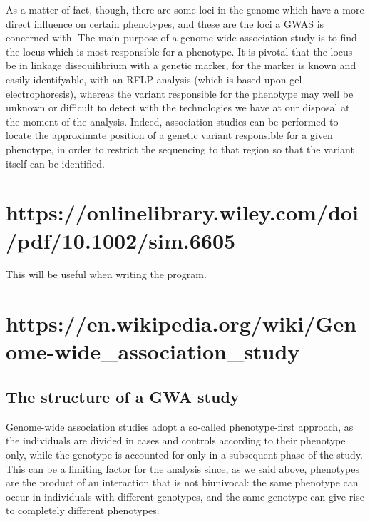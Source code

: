 \documentclass[../main.tex]{subfiles}
\begin{document}
As a matter of fact, though, there are some loci in the genome which 
have a more direct influence on certain phenotypes, and these are the 
loci a GWAS is concerned with. The main purpose of a genome-wide 
association study is to find the locus which is most responsible for a 
phenotype. It is pivotal that the locus be in linkage disequilibrium 
with a genetic marker, for the marker is known and easily identifyable, 
\eg with an RFLP analysis (which is based upon gel electrophoresis), 
whereas the variant responsible for the phenotype may well be unknown or 
difficult to detect with the technologies we have at our disposal at the 
moment of the analysis.  
Indeed, association studies can be performed to locate the approximate 
position of a genetic variant responsible for a given phenotype, in 
order to restrict the sequencing to that region so that the variant 
itself can be identified.

\section{https://onlinelibrary.wiley.com/doi/pdf/10.1002/sim.6605}

This will be useful when writing the program.

\section{https://en.wikipedia.org/wiki/Genome-wide\_association\_study}

\subsection{The structure of a GWA study}

Genome-wide association studies adopt a so-called phenotype-first 
approach, as the individuals are divided in cases and controls according 
to their phenotype only, while the genotype is accounted for only in a 
subsequent phase of the study. This can be a limiting factor for the 
analysis since, as we said above, phenotypes are the product of an 
interaction that is not biunivocal: the same phenotype can occur in 
individuals with different genotypes, and the same genotype can give 
rise to completely different phenotypes.
\end{document}
